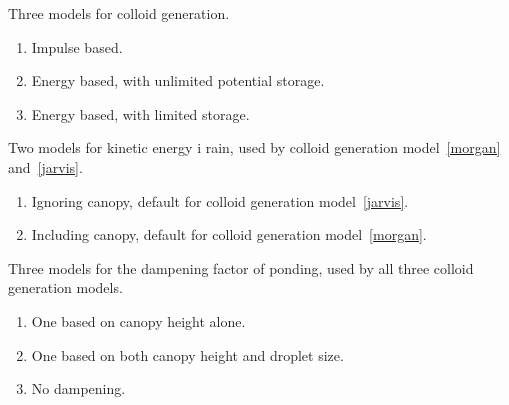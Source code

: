 \documentclass[a4paper,11pt,twoside]{article}
\begin{document}
Three models for colloid generation.
\begin{enumerate}
\item Impulse based. \cite{styczen88}
\item\label{morgan} Energy based, with unlimited potential
  storage. \cite{EUROSEM}
\item\label{jarvis} Energy based, with limited storage. \cite{macro-colloid}
\end{enumerate}

Two models for kinetic energy i rain, used by colloid generation
model~\ref{morgan} and~\ref{jarvis}.
\begin{enumerate}
\item Ignoring canopy, default for colloid generation
  model~\ref{jarvis}. \cite{Brown87}
\item Including canopy, default for colloid generation
  model~\ref{morgan}. \cite{EUROSEM}
\end{enumerate}

Three models for the dampening factor of ponding, used by all three
colloid generation models.
\begin{enumerate}
\item One based on canopy height alone. \cite{EUROSEM}
\item One based on both canopy height and droplet size. \cite{Park82}
\item No dampening.
\end{enumerate}



\end{document}
